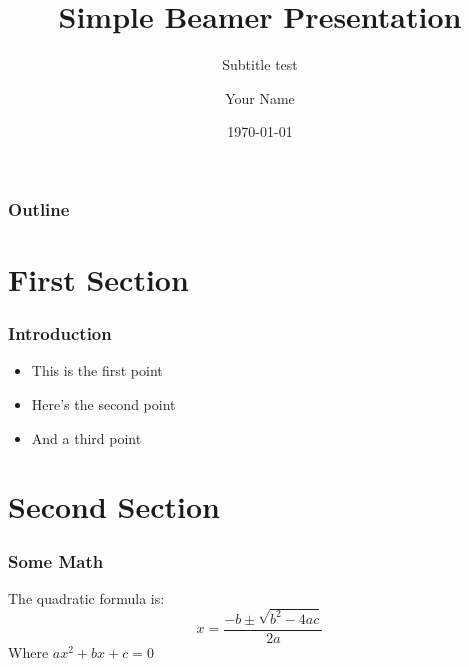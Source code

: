 \documentclass[10pt, aspectratio = 169]{beamer}
\title{Simple Beamer Presentation}
\subtitle{Subtitle test}
\author{Your Name}
\institute{Your Institution}
\date{\today}
\begin{document}
\begin{frame}
    \titlepage
\end{frame}

\begin{frame}
    \frametitle{Outline}
    \tableofcontents
\end{frame}

\section{First Section}
\begin{frame}
    \frametitle{Introduction}
    \begin{itemize}
        \item This is the first point
        \item Here's the second point
        \item And a third point
    \end{itemize}
\end{frame}

\section{Second Section}
\begin{frame}
    \frametitle{Some Math}
    The quadratic formula is:
    \[x = \frac{-b \pm \sqrt{b^2 - 4ac}}{2a}\]
    Where $ax^2 + bx + c = 0$
\end{frame}
\end{document}
